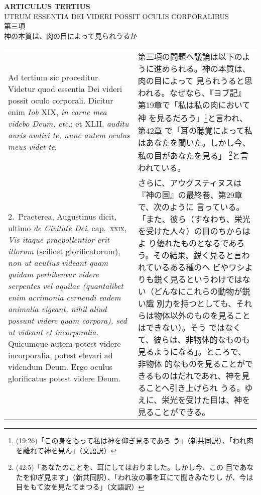 \documentclass[10pt]{jsarticle} %
\begin{document}
\begin{center}
{\Large {\bf ARTICULUS TERTIUS}}\\
{\large UTRUM ESSENTIA DEI VIDERI POSSIT OCULIS CORPORALIBUS}\\
{\large 第三項\\神の本質は、肉の目によって見られうるか}
\end{center}

\begin{longtable}{p{21em}p{21em}}

{\sc \large Ad tertium sic proceditur}. Videtur quod essentia Dei videri
possit oculo corporali. Dicitur enim {\it Iob} XIX, {\it in carne mea videbo Deum,
etc}.; et XLII, {\it auditu auris audivi te, nunc autem oculus meus videt te}.

&

第三項の問題へ議論は以下のように進められる。神の本質は、肉の目によって
見られうると思われる。なぜなら、『ヨブ記』第19章で「私は私の肉において神
を見るだろう」\footnote{(19:26)「この身をもって私は神を仰ぎ見るであろ
う」（新共同訳）、「われ肉を離れて神を見ん」（文語訳）}と言われ、第42章
で「耳の聴覚によって私はあなたを聞いた。しかし今、私の目があなたを見る」
\footnote{(42:5)「あなたのことを、耳にしてはおりました。しかし今、この
目であなたを仰ぎ見ます」（新共同訳）、「われ汝の事を耳にて聞きゐたりし
が、今は目をもて汝を見たてまつる」（文語訳）}と言われている。

\\

2.~{\sc Praeterea}, Augustinus dicit, ultimo {\it de Civitate Dei},
cap.\ {\scshape xxix}, {\it Vis itaque praepollentior erit illorum}
(scilicet glorificatorum), {\it non ut acutius videant quam quidam
perhibentur videre serpentes vel aquilae (quantalibet enim acrimonia
cernendi eadem animalia vigeant, nihil aliud possunt videre quam
corpora), sed ut videant et incorporalia}.  Quicumque autem potest
videre incorporalia, potest elevari ad videndum Deum. Ergo oculus
glorificatus potest videre Deum.

&

さらに、アウグスティヌスは『神の国』の最終巻、第29章で、次のように
言っている。「また、彼ら（すなわち、栄光を受けた人々）の目のちからはよ
り優れたものとなるであろう。その結果、鋭く見ると言われているある種のヘ
ビやワシよりも鋭く見るというわけではない（どんなにこれらの動物が鋭い識
別力を持つとしても、それらは物体以外のものを見ることはできない）。そう
ではなくて、彼らは、非物体的なものも見るようになる」。ところで、非物体
的なものを見ることができるものはだれであれ、神を見ることへ引き上げられ
うる。ゆえに、栄光を受けた目は、神を見ることができる。


\end{longtable}
\end{document}
